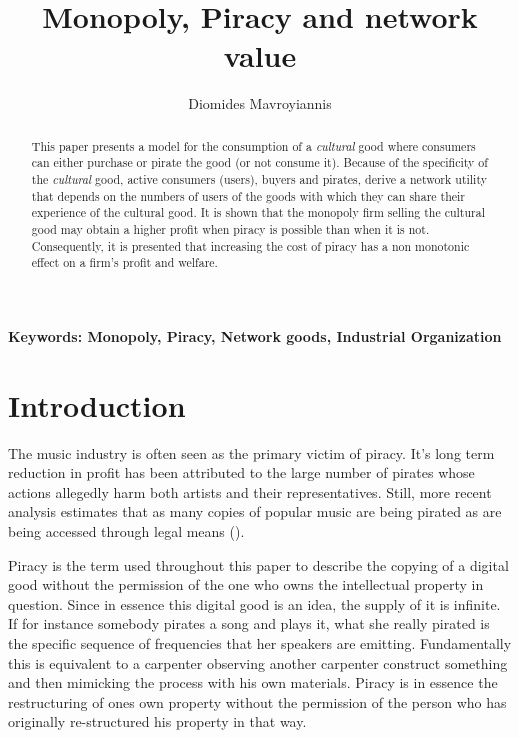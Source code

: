 \documentclass[11pt]{article}
\begin{document}
\title{Monopoly, Piracy and network value}
\author{Diomides Mavroyiannis}

\maketitle

\begin{abstract}
This paper presents a model for the consumption of a \textit{cultural} good where consumers can either purchase or pirate the good (or not consume it). Because of the specificity of the \textit{cultural} good, active consumers (users), buyers and pirates, derive a network utility that depends on the numbers of users of the goods with which they can share their experience of the cultural good. It is shown that the monopoly firm selling the cultural good may obtain a higher profit when piracy is possible than when it is not. Consequently, it is presented that increasing the cost of piracy has a non monotonic effect on a firm's profit and welfare.
\end{abstract}

\noindent\textbf{Keywords: Monopoly, Piracy, Network goods, Industrial Organization}

\section{Introduction}

The music industry is often seen as the primary victim of piracy. It's long term reduction in profit has been attributed to the large number of pirates whose actions allegedly harm both artists and their representatives\citep{B03}. Still, more recent analysis estimates that as many copies of popular music are being pirated as are being accessed through legal means (\citep{O15}).

\iffalse
Piracy is the term used throughout this paper to describe the copying of a digital good without the permission of the one who owns the intellectual property in question. Since in essence this digital good is an idea, the supply of it is infinite. If for instance somebody pirates a song and plays it, what she really pirated is the specific sequence of frequencies that her speakers are emitting. Fundamentally this is equivalent to a carpenter observing another carpenter construct something and then mimicking the process with his own materials. Piracy is in essence the restructuring of ones  own property without the permission of the person who has originally re-structured his property in that way.
\end{document}
